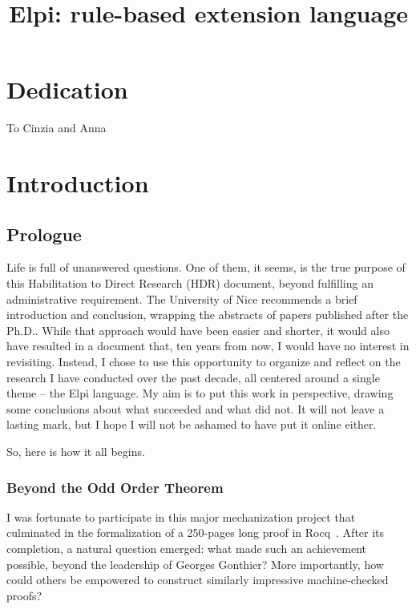 \documentclass[a4paper, 11pt]{book}
\title{Elpi: rule-based extension language}
\newenvironment{dedication}
  {%
   \thispagestyle{empty}%
   \vspace*{\stretch{1}}%
   \itshape             %
   \raggedleft          %
  }
  {\par %
   \vspace{\stretch{3}} %
   \clearpage           %
  }
\begin{document}
\maketitle
\chapter*{Dedication}
\begin{dedication}
To Cinzia and Anna
\end{dedication}

\setcounter{tocdepth}{5}
\tableofcontents

 \chapter{Introduction}


\section{Prologue}



Life is full of unanswered questions. One of them, it seems, is the true purpose
of this Habilitation to Direct Research (HDR) document, beyond fulfilling an administrative requirement. The
University of Nice recommends a brief introduction and conclusion, wrapping
the abstracts of papers published after the Ph.D.. While that approach would have
been easier and shorter, it would also have resulted in a document that, ten
years from now, I would have no interest in revisiting. Instead, I chose to use
this opportunity to organize and reflect on the research I have conducted over
the past decade, all centered around a single theme -- the Elpi language. My aim is
to put this work in perspective, drawing some conclusions about what succeeded
and what did not. It will not leave a lasting mark, but I hope I will not be
ashamed to have put it online either.

So, here is how it all begins.

\subsection{Beyond the Odd Order Theorem}



I was fortunate to participate in this major mechanization project that culminated
in the formalization of a 250-pages long proof in Rocq~\cite{DBLP:conf/itp/GonthierAABCGRMOBPRSTT13}.
After its completion, a natural question emerged: what made such an achievement
possible, beyond the leadership of Georges Gonthier? More importantly, how could
others be empowered to construct similarly impressive machine-checked proofs?
\end{document}
